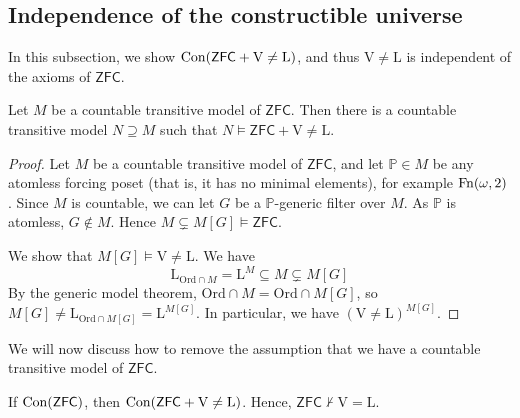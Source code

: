 \subsection{Independence of the constructible universe}
In this subsection, we show \( \operatorname{Con}(\mathsf{ZFC} + \mathrm{V} \neq \mathrm{L}) \), and thus \( \mathrm{V} \neq \mathrm{L} \) is independent of the axioms of \( \mathsf{ZFC} \).
\begin{theorem}
    Let \( M \) be a countable transitive model of \( \mathsf{ZFC} \).
    Then there is a countable transitive model \( N \supseteq M \) such that \( N \vDash \mathsf{ZFC} + \mathrm{V} \neq \mathrm{L} \).
\end{theorem}
\begin{proof}
    Let \( M \) be a countable transitive model of \( \mathsf{ZFC} \), and let \( \mathbb P \in M \) be any atomless forcing poset (that is, it has no minimal elements), for example \( \operatorname{Fn}(\omega, 2) \).
    Since \( M \) is countable, we can let \( G \) be a \( \mathbb P \)-generic filter over \( M \).
    As \( \mathbb P \) is atomless, \( G \notin M \).
    Hence \( M \subsetneq M[G] \vDash \mathsf{ZFC} \).

    We show that \( M[G] \vDash \mathrm{V} \neq \mathrm{L} \).
    We have
    \[ \mathrm{L}_{\mathrm{Ord} \cap M} = \mathrm{L}^M \subseteq M \subsetneq M[G] \]
    By the generic model theorem, \( \mathrm{Ord} \cap M = \mathrm{Ord} \cap M[G] \), so \( M[G] \neq \mathrm{L}_{\mathrm{Ord} \cap M[G]} = \mathrm{L}^{M[G]} \).
    In particular, we have \( (\mathrm{V} \neq \mathrm{L})^{M[G]} \).
\end{proof}
We will now discuss how to remove the assumption that we have a countable transitive model of \( \mathsf{ZFC} \).
\begin{theorem}
    If \( \operatorname{Con}(\mathsf{ZFC}) \), then \( \operatorname{Con}(\mathsf{ZFC} + \mathrm{V} \neq \mathrm{L}) \).
    Hence, \( \mathsf{ZFC} \nvdash \mathrm{V} = \mathrm{L} \).
\end{theorem}

